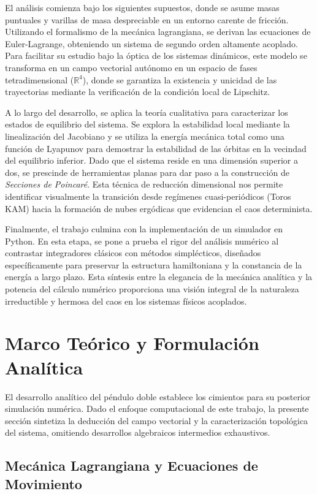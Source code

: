 \documentclass[13pt]{extarticle}
\begin{document}
El análisis comienza bajo los siguientes supuestos, donde se asume masas puntuales y varillas de masa despreciable en un entorno carente de fricción. Utilizando el formalismo de la mecánica lagrangiana, se derivan las ecuaciones de Euler-Lagrange, obteniendo un sistema de segundo orden altamente acoplado. Para facilitar su estudio bajo la óptica de los sistemas dinámicos, este modelo se transforma en un campo vectorial autónomo en un espacio de fases tetradimensional ($\mathbb{R}^4$), donde se garantiza la existencia y unicidad de las trayectorias mediante la verificación de la condición local de Lipschitz.

A lo largo del desarrollo, se aplica la teoría cualitativa para caracterizar los estados de equilibrio del sistema. Se explora la estabilidad local mediante la linealización del Jacobiano y se utiliza la energía mecánica total como una función de Lyapunov para demostrar la estabilidad de las órbitas en la vecindad del equilibrio inferior. Dado que el sistema reside en una dimensión superior a dos, se prescinde de herramientas planas para dar paso a la construcción de \textit{Secciones de Poincaré}. Esta técnica de reducción dimensional nos permite identificar visualmente la transición desde regímenes cuasi-periódicos (Toros KAM) hacia la formación de nubes ergódicas que evidencian el caos determinista.

Finalmente, el trabajo culmina con la implementación de un simulador en Python. En esta etapa, se pone a prueba el rigor del análisis numérico al contrastar integradores clásicos con métodos simplécticos, diseñados específicamente para preservar la estructura hamiltoniana y la constancia de la energía a largo plazo. Esta síntesis entre la elegancia de la mecánica analítica y la potencia del cálculo numérico proporciona una visión integral de la naturaleza irreductible y hermosa del caos en los sistemas físicos acoplados.

\section{Marco Teórico y Formulación Analítica}


El desarrollo analítico del péndulo doble establece los cimientos para su posterior simulación numérica. Dado el enfoque computacional de este trabajo, la presente sección sintetiza la deducción del campo vectorial y la caracterización topológica del sistema, omitiendo desarrollos algebraicos intermedios exhaustivos.


\subsection{Mecánica Lagrangiana y Ecuaciones de Movimiento}
\end{document}
